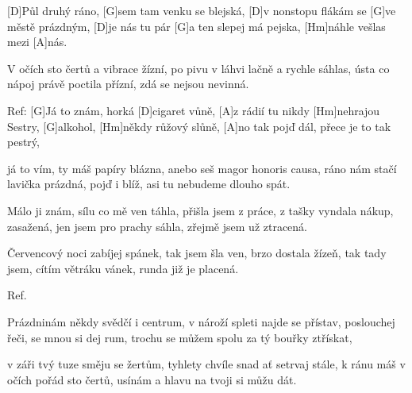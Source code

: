 
[D]Půl druhý ráno, [G]sem tam venku se blejská,
[D]v nonstopu flákám se [G]ve městě prázdným,
[D]je nás tu pár [G]a ten slepej má pejska,
[Hm]náhle vešlas mezi [A]nás.

V očích sto čertů a vibrace žízní,
po pivu v láhvi lačně a rychle sáhlas,
ústa co nápoj právě poctila přízní,
zdá se nejsou nevinná.

Ref:
[G]Já to znám, horká [D]cigaret vůně,
[A]z rádií tu nikdy [Hm]nehrajou Sestry,
[G]alkohol, [Hm]někdy růžový slůně,
[A]no tak pojď dál, přece je to tak pestrý,

já to vím, ty máš papíry blázna,
anebo seš magor honoris causa,
ráno nám stačí lavička prázdná,
pojď i blíž, asi tu nebudeme dlouho spát.

Málo ji znám, sílu co mě ven táhla,
přišla jsem z práce, z tašky vyndala nákup,
zasažená, jen jsem pro prachy sáhla,
zřejmě jsem už ztracená.

Červencový noci zabíjej spánek,
tak jsem šla ven, brzo dostala žízeň,
tak tady jsem, cítím větráku vánek,
runda již je placená.

Ref.

Prázdninám někdy svědčí i centrum,
v nároží spleti najde se přístav,
poslouchej řeči, se mnou si dej rum,
trochu se můžem spolu za tý bouřky ztřískat,

v záři tvý tuze směju se žertům,
tyhlety chvíle snad ať setrvaj stále,
k ránu máš v očích pořád sto čertů,
usínám a hlavu na tvoji si můžu dát.